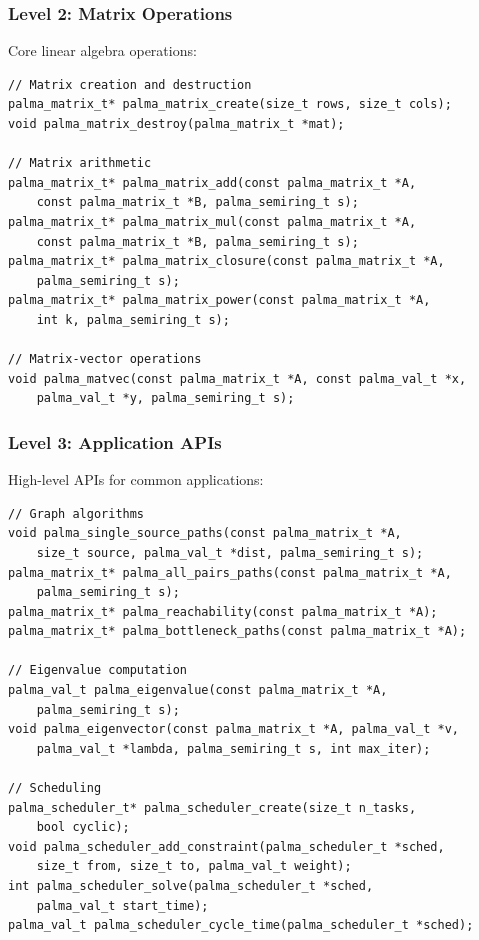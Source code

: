 \documentclass[11pt,a4paper]{article}
\theoremstyle{plain}
\theoremstyle{definition}
\begin{document}
\subsubsection{Level 2: Matrix Operations}

Core linear algebra operations:

\begin{lstlisting}[caption={Matrix operation API}]
// Matrix creation and destruction
palma_matrix_t* palma_matrix_create(size_t rows, size_t cols);
void palma_matrix_destroy(palma_matrix_t *mat);

// Matrix arithmetic
palma_matrix_t* palma_matrix_add(const palma_matrix_t *A,
    const palma_matrix_t *B, palma_semiring_t s);
palma_matrix_t* palma_matrix_mul(const palma_matrix_t *A,
    const palma_matrix_t *B, palma_semiring_t s);
palma_matrix_t* palma_matrix_closure(const palma_matrix_t *A,
    palma_semiring_t s);
palma_matrix_t* palma_matrix_power(const palma_matrix_t *A,
    int k, palma_semiring_t s);

// Matrix-vector operations
void palma_matvec(const palma_matrix_t *A, const palma_val_t *x,
    palma_val_t *y, palma_semiring_t s);
\end{lstlisting}

\subsubsection{Level 3: Application APIs}

High-level APIs for common applications:

\begin{lstlisting}[caption={Application-level API}]
// Graph algorithms
void palma_single_source_paths(const palma_matrix_t *A,
    size_t source, palma_val_t *dist, palma_semiring_t s);
palma_matrix_t* palma_all_pairs_paths(const palma_matrix_t *A,
    palma_semiring_t s);
palma_matrix_t* palma_reachability(const palma_matrix_t *A);
palma_matrix_t* palma_bottleneck_paths(const palma_matrix_t *A);

// Eigenvalue computation
palma_val_t palma_eigenvalue(const palma_matrix_t *A,
    palma_semiring_t s);
void palma_eigenvector(const palma_matrix_t *A, palma_val_t *v,
    palma_val_t *lambda, palma_semiring_t s, int max_iter);

// Scheduling
palma_scheduler_t* palma_scheduler_create(size_t n_tasks,
    bool cyclic);
void palma_scheduler_add_constraint(palma_scheduler_t *sched,
    size_t from, size_t to, palma_val_t weight);
int palma_scheduler_solve(palma_scheduler_t *sched, 
    palma_val_t start_time);
palma_val_t palma_scheduler_cycle_time(palma_scheduler_t *sched);
\end{lstlisting}
\end{document}
